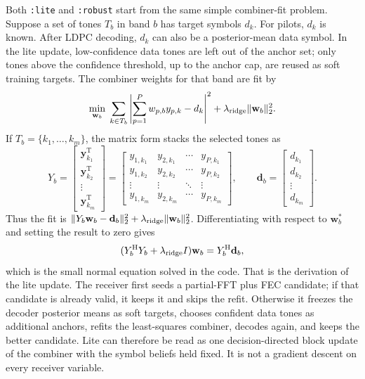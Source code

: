 \documentclass[11pt]{article}
\newcommand{\code}[1]{\texttt{#1}}
\begin{document}
Both \code{:lite} and \code{:robust} start from the same simple combiner-fit
problem. Suppose a set of tones \(T_b\) in band \(b\) has target symbols \(d_k\).
For pilots, \(d_k\) is known. After LDPC decoding, \(d_k\) can also be a
posterior-mean data symbol. In the lite update, low-confidence data tones are
left out of the anchor set; only tones above the confidence threshold, up to the
anchor cap, are reused as soft training targets. The combiner weights for that
band are fit by
\begin{equation}
  \min_{\mathbf w_b}\;
  \sum_{k\in T_b}\left|\sum_{p=1}^{P} w_{p,b}y_{p,k}-d_k\right|^2
  + \lambda_{\rm ridge}\|\mathbf w_b\|_2^2 .
\end{equation}
If \(T_b=\{k_1,\ldots,k_m\}\), the matrix form stacks the selected tones as
\begin{equation}
  Y_b =
  \begin{bmatrix}
    \mathbf y_{k_1}^{\mathrm T}\\
    \mathbf y_{k_2}^{\mathrm T}\\
    \vdots\\
    \mathbf y_{k_m}^{\mathrm T}
  \end{bmatrix}
  =
  \begin{bmatrix}
    y_{1,k_1} & y_{2,k_1} & \cdots & y_{P,k_1}\\
    y_{1,k_2} & y_{2,k_2} & \cdots & y_{P,k_2}\\
    \vdots & \vdots & \ddots & \vdots\\
    y_{1,k_m} & y_{2,k_m} & \cdots & y_{P,k_m}
  \end{bmatrix},
  \qquad
  \mathbf d_b =
  \begin{bmatrix}
    d_{k_1}\\
    d_{k_2}\\
    \vdots\\
    d_{k_m}
  \end{bmatrix}.
\end{equation}
Thus the fit is
\(\|Y_b\mathbf w_b-\mathbf d_b\|_2^2+
\lambda_{\rm ridge}\|\mathbf w_b\|_2^2\). Differentiating with
respect to \(\mathbf w_b^*\) and setting the result to zero gives
\begin{equation}
  (Y_b^{\mathrm{H}}Y_b+\lambda_{\rm ridge}I)\mathbf w_b
    = Y_b^{\mathrm{H}}\mathbf d_b ,
\end{equation}
which is the small normal equation solved in the code. That is the derivation
of the lite update. The receiver first seeds a partial-FFT plus FEC candidate; if
that candidate is already valid, it keeps it and skips the refit. Otherwise it
freezes the decoder posterior means as soft targets, chooses confident data
tones as additional anchors, refits the least-squares combiner, decodes again,
and keeps the better candidate. Lite can therefore be read as one
decision-directed block update of the combiner with the symbol beliefs held
fixed. It is not a gradient descent on every receiver variable.
\end{document}
